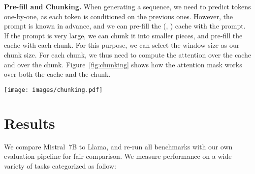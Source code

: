 \documentclass{article}
\def\llama{Llama\xspace}
\def\mistral{Mistral~7B\xspace}
\begin{document}
\begin{figure*}

\caption{\small \textbf{Rolling buffer cache.} The cache has a fixed size of . Keys and values for position  are stored in position  of the cache. When the position  is larger than , past values in the cache are overwritten.
The hidden state corresponding to the latest generated tokens are colored in orange.
}
\label{fig:cache}
\end{figure*}


 \textbf{Pre-fill and Chunking.} When generating a sequence, we need to predict tokens one-by-one, as each token is conditioned on the previous ones. However, the prompt is known in advance, and we can pre-fill the (, ) cache with the prompt. If the prompt is very large, we can chunk it into smaller pieces, and pre-fill the cache with each chunk. For this purpose, we can select the window size as our chunk size. 
For each chunk, we thus need to compute the attention over the cache and over the chunk. 
Figure~\ref{fig:chunking} shows how the attention mask works over both the cache and the chunk.


\begin{figure*}[h]
\centering
\texttt{[image: images/chunking.pdf]} 
\caption{
\small
\textbf{Pre-fill and chunking.}
During pre-fill of the cache, long sequences are chunked to limit memory usage.
We process a sequence in three chunks, ``The cat sat on'', ``the mat and saw'', ``the dog go to''. 
The figure shows what happens for the third chunk (``the dog go to''): it attends itself using a causal mask (rightmost block), attends the cache using a sliding window (center block), and does not attend to past tokens as they are outside of the sliding window (left block).
}
\label{fig:chunking}
\vspace{0.1in}
\end{figure*}

\section{Results}

We compare \mistral to \llama, and re-run all benchmarks with our own evaluation pipeline for fair comparison.
We measure performance on a wide variety of tasks categorized as follow:
\end{document}
